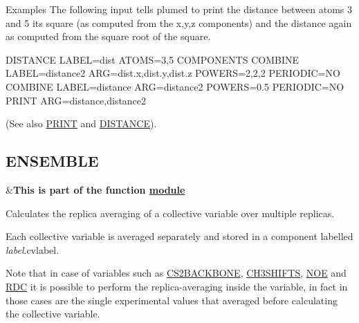 \begin{DoxyParagraph}{Examples}
The following input tells plumed to print the distance between atoms 3 and 5 its square (as computed from the x,y,z components) and the distance again as computed from the square root of the square. \begin{DoxyVerb}DISTANCE LABEL=dist      ATOMS=3,5 COMPONENTS
COMBINE  LABEL=distance2 ARG=dist.x,dist.y,dist.z POWERS=2,2,2 PERIODIC=NO
COMBINE  LABEL=distance  ARG=distance2 POWERS=0.5 PERIODIC=NO
PRINT ARG=distance,distance2
\end{DoxyVerb}
 (See also \hyperlink{PRINT}{P\+R\+I\+N\+T} and \hyperlink{DISTANCE}{D\+I\+S\+T\+A\+N\+C\+E}). 
\end{DoxyParagraph}
\hypertarget{ENSEMBLE}{}\subsection{E\+N\+S\+E\+M\+B\+L\+E}\label{ENSEMBLE}
\begin{TabularC}{2}
\hline
&{\bfseries  This is part of the function \hyperlink{mymodules}{module }}   \\
\end{TabularC}
Calculates the replica averaging of a collective variable over multiple replicas.

Each collective variable is averaged separately and stored in a component labelled {\itshape label}.cvlabel.

Note that in case of variables such as \hyperlink{CS2BACKBONE}{C\+S2\+B\+A\+C\+K\+B\+O\+N\+E}, \hyperlink{CH3SHIFTS}{C\+H3\+S\+H\+I\+F\+T\+S}, \hyperlink{NOE}{N\+O\+E} and \hyperlink{RDC}{R\+D\+C} it is possible to perform the replica-\/averaging inside the variable, in fact in those cases are the single experimental values that averaged before calculating the collective variable.

